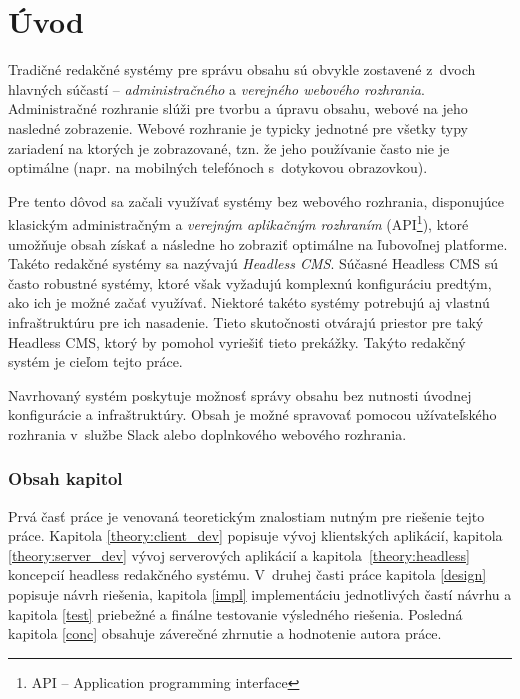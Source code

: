 \chapter{Úvod}
Tradičné redakčné systémy pre správu obsahu sú obvykle zostavené z~dvoch hlavných súčastí -- \emph{administračného} a \emph{verejného webového rozhrania}. Administračné rozhranie slúži pre tvorbu a úpravu obsahu, webové na jeho nasledné zobrazenie. Webové rozhranie je typicky jednotné pre všetky typy zariadení na ktorých je zobrazované, tzn. že jeho používanie často nie je optimálne (napr. na mobilných telefónoch s~dotykovou obrazovkou).

Pre tento dôvod sa začali využívať systémy bez webového rozhrania, disponujúce klasickým administračným a \emph{verejným aplikačným rozhraním} (API\footnote{API -- Application programming interface}), ktoré umožňuje obsah získať a následne ho zobraziť optimálne na ľubovoľnej platforme. Takéto redakčné systémy sa nazývajú \emph{Headless CMS}. Súčasné Headless CMS sú často robustné systémy, ktoré však vyžadujú komplexnú konfiguráciu predtým, ako ich je možné začať využívať. Niektoré takéto systémy potrebujú aj vlastnú infraštruktúru pre ich nasadenie. Tieto skutočnosti otvárajú priestor pre taký Headless CMS, ktorý by pomohol vyriešiť tieto prekážky. Takýto redakčný systém je cieľom tejto práce.

Navrhovaný systém poskytuje možnosť správy obsahu bez nutnosti úvodnej konfigurácie a infraštruktúry. Obsah je možné spravovať pomocou užívateľského rozhrania v~službe Slack alebo doplnkového webového rozhrania.

\subsection*{Obsah kapitol}
Prvá časť práce je venovaná teoretickým znalostiam nutným pre riešenie tejto práce. Kapitola \ref{theory:client_dev} popisuje vývoj klientských aplikácií, kapitola \ref{theory:server_dev} vývoj serverových aplikácií a kapitola~\ref{theory:headless} koncepcií headless redakčného systému. V~druhej časti práce kapitola \ref{design} popisuje návrh riešenia, kapitola \ref{impl} implementáciu jednotlivých častí návrhu a kapitola \ref{test} priebežné a finálne testovanie výsledného riešenia. Posledná kapitola \ref{conc} obsahuje záverečné zhrnutie a hodnotenie autora práce.

